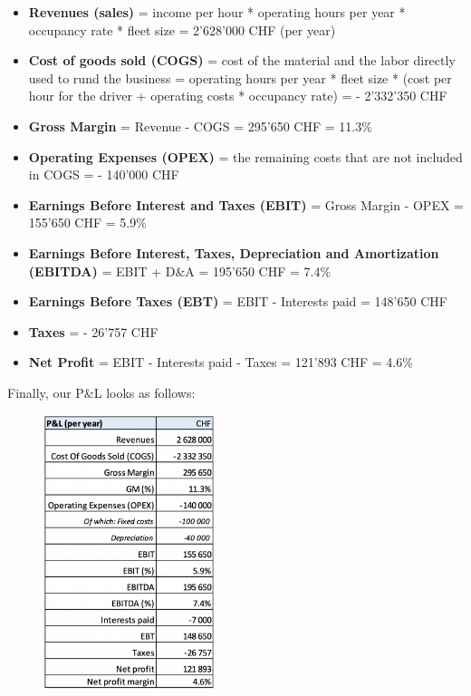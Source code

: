 \documentclass[a4paper]{extarticle}
\begin{document}
\begin{itemize}
    \item \textbf{Revenues (sales)} = income per hour * operating hours per year * occupancy rate * fleet size = 2'628'000 CHF (per year)
    \item \textbf{Cost of goods sold (COGS)} = cost of the material and the labor directly used to rund the business = operating hours per year * fleet size * (cost per hour for the driver + operating costs * occupancy rate) = - 2'332'350 CHF
    \item \textbf{Gross Margin} = Revenue - COGS = 295'650 CHF = 11.3\%
    \item \textbf{Operating Expenses (OPEX)} = the remaining costs that are not included in COGS = - 140'000 CHF
    \item \textbf{Earnings Before Interest and Taxes (EBIT)} = Gross Margin - OPEX = 155'650 CHF = 5.9\%
    \item \textbf{Earnings Before Interest, Taxes, Depreciation and Amortization (EBITDA)} = EBIT + D\&A = 195'650 CHF = 7.4\%
    \item \textbf{Earnings Before Taxes (EBT)} = EBIT - Interests paid = 148'650 CHF
    \item \textbf{Taxes} = - 26'757 CHF
    \item \textbf{Net Profit} = EBIT - Interests paid - Taxes = 121'893 CHF = 4.6\%
\end{itemize}

Finally, our P\&L looks as follows:

\begin{figure}[H]
    \includegraphics[width=5cm]{../images/EnpRisk_Fig3-6}
    \centering
\end{figure}
\end{document}

